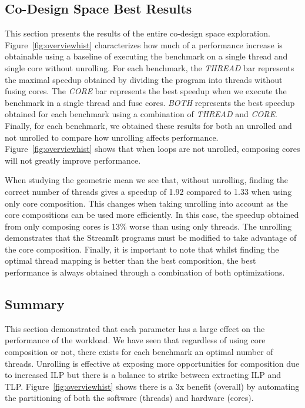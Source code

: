 \subsection{Co-Design Space Best Results}

This section  presents the results of the entire co-design space exploration.
Figure~\ref{fig:overviewhist} characterizes how much of a performance increase is obtainable using a baseline of executing the benchmark on a single thread and single core without unrolling.
For each benchmark, the \textit{THREAD} bar represents the maximal speedup obtained by dividing the program into threads without fusing cores.
The \textit{CORE} bar represents the best speedup when we execute the benchmark in a single thread and fuse cores.
\textit{BOTH} represents the best speedup obtained for each benchmark using a combination of \textit{THREAD} and \textit{CORE}.
Finally, for each benchmark, we obtained these results for both an unrolled and not unrolled to compare how unrolling affects performance.
Figure~\ref{fig:overviewhist} shows that when loops are not unrolled, composing cores will not greatly improve performance.

When studying the geometric mean we see that, without unrolling, finding the correct number of threads gives a speedup of 1.92 compared to 1.33 when using only core composition.
This changes when taking unrolling into account as the core compositions can be used more efficiently.
In this case, the speedup obtained from only composing cores is 13\% worse than using only threads. 
The unrolling demonstrates that the StreamIt programs must be modified to take advantage of the core composition.
Finally, it is important to note that whilst finding the optimal thread mapping is better than the best composition, the best performance is always obtained through a combination of both optimizations. 
\vspace{-1mm}
\subsection{Summary}

This section demonstrated that each parameter has a large effect on the performance of the workload.
We have seen that regardless of using core composition or not, there exists for each benchmark an optimal number of threads.
Unrolling is effective at exposing more opportunities for composition due to increased ILP but there is a balance to strike between extracting ILP and TLP.
Figure~\ref{fig:overviewhist} shows there is a 3x benefit (overall) by automating the partitioning of both the software (threads) and hardware (cores).

\vspace{-2mm}

